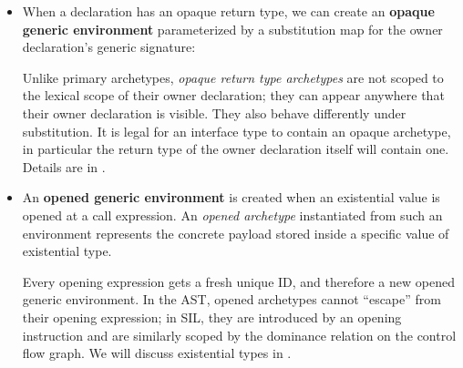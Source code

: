 \documentclass[../generics]{subfiles}
\begin{document}
\begin{itemize}
\item When a declaration has an opaque return type, we can create an \textbf{opaque generic environment} parameterized by a substitution map for the owner declaration's generic signature:
\begin{tightcenter}
\end{tightcenter}
Unlike primary archetypes, \emph{opaque return type archetypes} are not scoped to the lexical scope of their owner declaration; they can appear anywhere that their owner declaration is visible. They also behave differently under substitution. It is legal for an interface type to contain an opaque archetype, in particular the return type of the owner declaration itself will contain one. Details are in .
\item An \textbf{opened generic environment} is created when an existential value is opened at a call expression. An \emph{opened archetype} instantiated from such an environment represents the concrete payload stored inside a specific value of existential type.
\begin{tightcenter}
\end{tightcenter}
Every opening expression gets a fresh unique ID, and therefore a new opened generic environment. In the AST, opened archetypes cannot ``escape'' from their opening expression; in SIL, they are introduced by an opening instruction and are similarly scoped by the dominance relation on the control flow graph. We will discuss existential types in .
\end{itemize}
\end{document}
